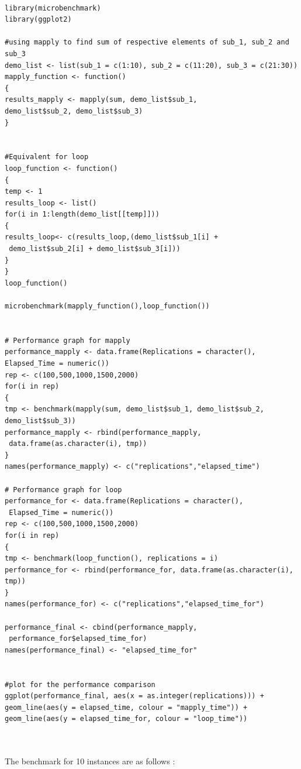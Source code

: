 \documentclass{article}
\begin{document}
\begin{lstlisting}

library(microbenchmark)
library(ggplot2)

#using mapply to find sum of respective elements of sub_1, sub_2 and sub_3
demo_list <- list(sub_1 = c(1:10), sub_2 = c(11:20), sub_3 = c(21:30))
mapply_function <- function()
{
results_mapply <- mapply(sum, demo_list$sub_1, 
demo_list$sub_2, demo_list$sub_3)
}


#Equivalent for loop
loop_function <- function()
{
temp <- 1
results_loop <- list()
for(i in 1:length(demo_list[[temp]]))
{
results_loop<- c(results_loop,(demo_list$sub_1[i] +
 demo_list$sub_2[i] + demo_list$sub_3[i]))
}
}
loop_function()

microbenchmark(mapply_function(),loop_function())


# Performance graph for mapply
performance_mapply <- data.frame(Replications = character(),
Elapsed_Time = numeric())
rep <- c(100,500,1000,1500,2000)
for(i in rep)
{
tmp <- benchmark(mapply(sum, demo_list$sub_1, demo_list$sub_2,
demo_list$sub_3))
performance_mapply <- rbind(performance_mapply,
 data.frame(as.character(i), tmp))
}
names(performance_mapply) <- c("replications","elapsed_time")

# Performance graph for loop
performance_for <- data.frame(Replications = character(),
 Elapsed_Time = numeric())
rep <- c(100,500,1000,1500,2000)
for(i in rep)
{
tmp <- benchmark(loop_function(), replications = i)
performance_for <- rbind(performance_for, data.frame(as.character(i), tmp))
}
names(performance_for) <- c("replications","elapsed_time_for")

performance_final <- cbind(performance_mapply,
 performance_for$elapsed_time_for)
names(performance_final) <- "elapsed_time_for"


#plot for the performance comparison
ggplot(performance_final, aes(x = as.integer(replications))) + 
geom_line(aes(y = elapsed_time, colour = "mapply_time")) + 
geom_line(aes(y = elapsed_time_for, colour = "loop_time"))	

	
	\end{lstlisting}
	The benchmark for 10 instances are as follows :
\end{document}
